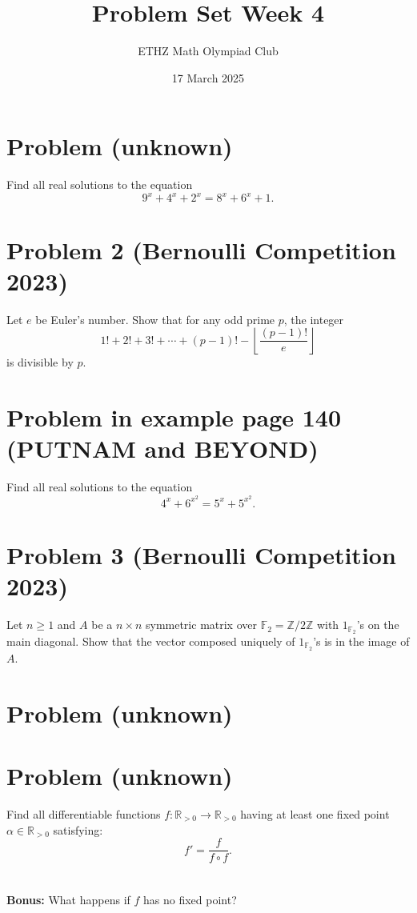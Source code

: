 \documentclass[11pt, a4paper, oneside]{article}
\title{Problem Set Week 4}
\author{ETHZ Math Olympiad Club}
\date{17 March 2025}
\newcommand{\problem}[1][]{\section{#1} \hfill \par}
\theoremstyle{remark}
\begin{document}
\maketitle
\problem[Problem (unknown)]
Find all real solutions to the equation
\[
9^{x} + 4^{x}+2^{x} = 8^{x} + 6^{x}+1.
\]
\problem[Problem 2 (Bernoulli Competition 2023)]
Let \( e \) be Euler’s number. Show that for any odd prime \( p \), the integer
\[
1! + 2! + 3! + \cdots + (p-1)! - \left\lfloor \frac{(p-1)!}{e} \right\rfloor
\]
is divisible by \( p \).

\problem[Problem in example page 140 (PUTNAM and BEYOND)]
Find all real solutions to the equation
\[
4^{x} + 6^{x^{2}} = 5^{x} + 5^{x^{2}}.
\]

\problem[Problem 3 (Bernoulli Competition 2023)]
Let $n\geq 1$ and \( A \) be a $n\times n$ symmetric matrix over \( \mathbb{F}_2 = \mathbb{Z}/2\mathbb{Z} \) with \( 1_{\mathbb{F}_2} \)’s on the main diagonal. Show that the vector composed uniquely of $1_{\mathbb{F}_2}$'s is in the image of \( A \).

\problem[Problem (unknown)]
\problem[Problem (unknown)]
Find all differentiable functions \( f : \mathbb{R}_{>0} \to \mathbb{R}_{>0} \) having at least one fixed point $\alpha\in\mathbb{R}_{>0}$ satisfying:
\[
f' = \frac{f}{f \circ f}.
\]
\\\\
\textbf{Bonus:} What happens if $f$ has no fixed point?
\end{document}
